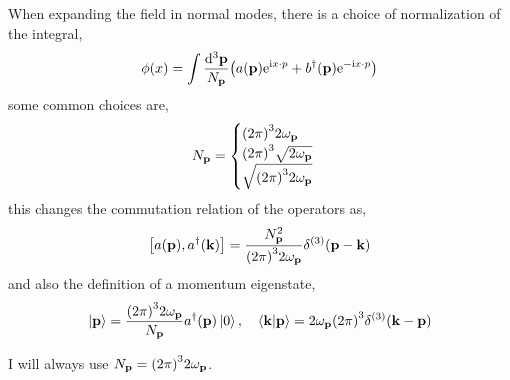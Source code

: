 When expanding the field in normal modes, there is a choice of normalization of the integral,
\begin{align}
    \phi\qty(x)=\int\frac{\dd[3]{\vb p}}{N_{\vb p}}\qty(a\qty(\vb p)\textnormal{e}^{\textnormal{i} x\cdot p}+b^\dagger\qty(\vb p)\textnormal{e}^{-\textnormal{i} x\cdot p})
\end{align}
some common choices are,
\begin{align}
    N_{\vb p} = \begin{cases}\qty(2\pi)^32\omega_{\vb p}\\ \qty(2\pi)^3\sqrt{2\omega_{\vb p}}\\ \sqrt{\qty(2\pi)^32\omega_{\vb p}}\end{cases}
\end{align}
this changes the commutation relation of the operators as,
\begin{align}
    \comm{a\qty(\vb p)}{a^\dagger\qty(\vb k)} = \frac{N_{\vb p}^2}{\qty(2\pi)^32\omega_{\vb p}}\delta^{\qty(3)}\qty(\vb p-\vb k)
\end{align}
and also the definition of a momentum eigenstate,
\begin{align}
    \ket{\vb p} = \frac{\qty(2\pi)^32\omega_{\vb p}}{N_{\vb p}}a^\dagger\qty(\vb p)\ket0,\ \ \ \braket{\vb k}{\vb p} = 2\omega_{\vb p}\qty(2\pi)^3\delta^{\qty(3)}\qty(\vb k-\vb p)
\end{align}

I will always use $N_{\vb p}=\qty(2\pi)^32\omega_{\vb p}$.